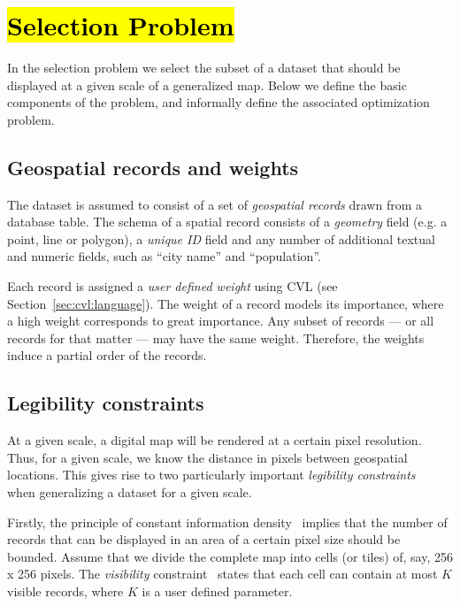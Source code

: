 \section{\hl{Selection Problem}}
\label{sec:background}

In the selection problem we select the subset of a dataset that should be displayed at a given scale of a generalized map. Below we define the basic components of the problem, and informally define the associated optimization problem.

\subsection{Geospatial records and weights}
\label{sec:records}

The dataset is assumed to consist of a set of \emph{geospatial records} drawn from a database table. The schema of a spatial record consists of a \emph{geometry} field (e.g. a point, line or polygon), a \emph{unique ID} field and any number of additional textual and numeric fields, such as ``city name'' and ``population''.

Each record is assigned a \emph{user defined weight} using CVL (see Section~\ref{sec:cvl:language}). The weight of a record models its importance, where a high weight corresponds to great importance. Any subset of records --- or all records for that matter --- may have the same weight. Therefore, the weights induce a partial order of the records.

\subsection{Legibility constraints}
\label{sec:mapconstraints}

At a given scale, a digital map will be rendered at a certain pixel resolution. Thus, for a given scale, we know the distance in pixels between geospatial locations. This gives rise to two particularly important \emph{legibility constraints}~\cite{harrie2007modelling} when generalizing a dataset for a given scale.

Firstly, the principle of constant information density~\cite{topfer1966principles} implies that the number of records that can be displayed in an area of a certain pixel size should be bounded. Assume that we divide the complete map into cells (or tiles) of, say, 256 x 256 pixels. The \emph{visibility} constraint~\cite{sarma2012fusiontables} states that each cell can contain at most $K$ visible records, where $K$ is a user defined parameter.

